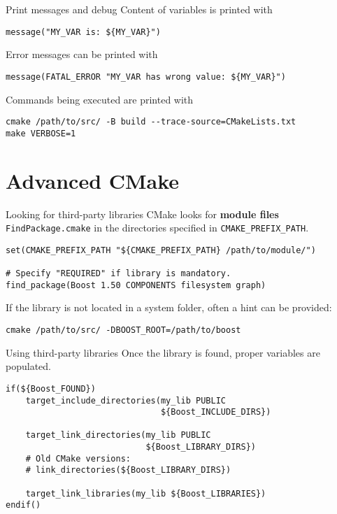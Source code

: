 \documentclass[aspectratio=169,11pt]{beamer}
\begin{document}
\begin{frame}[fragile]{Print messages and debug}
Content of variables is printed with
\begin{verbatim}
message("MY_VAR is: ${MY_VAR}")
\end{verbatim}
\vfill
Error messages can be printed with
\begin{verbatim}
message(FATAL_ERROR "MY_VAR has wrong value: ${MY_VAR}")
\end{verbatim}
\vfill
Commands being executed are printed with
\begin{verbatim}
cmake /path/to/src/ -B build --trace-source=CMakeLists.txt
make VERBOSE=1
\end{verbatim}
\end{frame}

\section{Advanced CMake}
\begin{frame}[fragile]{Looking for third-party libraries}
CMake looks for \textbf{module files} \texttt{FindPackage.cmake} in the directories specified in \texttt{CMAKE\_PREFIX\_PATH}.
\vfill
\begin{verbatim}
set(CMAKE_PREFIX_PATH "${CMAKE_PREFIX_PATH} /path/to/module/")

# Specify "REQUIRED" if library is mandatory.
find_package(Boost 1.50 COMPONENTS filesystem graph)
\end{verbatim}
\vfill
If the library is not located in a system folder, often a hint can be provided:
\begin{verbatim}
cmake /path/to/src/ -DBOOST_ROOT=/path/to/boost
\end{verbatim}
\end{frame}

\begin{frame}[fragile]{Using third-party libraries}
Once the library is found, proper variables are populated.
\begin{verbatim}
if(${Boost_FOUND})
    target_include_directories(my_lib PUBLIC
                               ${Boost_INCLUDE_DIRS})
    
    target_link_directories(my_lib PUBLIC
                            ${Boost_LIBRARY_DIRS})
    # Old CMake versions:
    # link_directories(${Boost_LIBRARY_DIRS})
    
    target_link_libraries(my_lib ${Boost_LIBRARIES})
endif()
\end{verbatim}
\end{frame}
\end{document}
